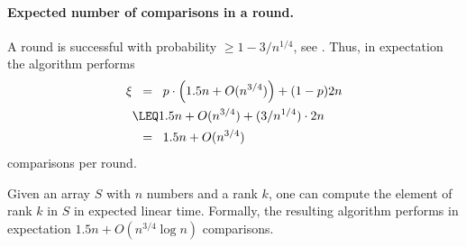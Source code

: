 \paragraph*{Expected number of comparisons in a round.}
A round is successful with probability
$\geq 1- 3/n^{1/4}$, see . Thus, in expectation the
algorithm performs
\begin{align*}
    \xi
    &\EQ
    p\cdot \Bigl(1.5n + O(n^{3/4})\Bigr) + (1-p)2n
    \\&
    \LEQ
    1.5n +  O(n^{3/4}) + (3/n^{1/4}) \cdot 2n
    \\&
    \EQ
    1.5n + O(n^{3/4})
\end{align*}
comparisons per round. 



\begin{theorem}
    Given an array $S$ with $n$ numbers and a rank $k$, one can compute
    the element of rank $k$ in $S$ in expected linear time.
    Formally, the resulting algorithm performs in expectation
    $1.5 n + O( n^{3/4} \log n)$ comparisons.
\end{theorem}
